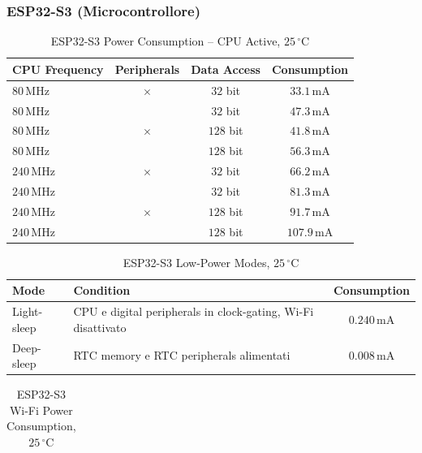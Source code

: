 \begin{samepage}
\subsubsection{ESP32-S3 (Microcontrollore)}
\begin{table}[H]
	\centering
	\caption{ESP32-S3 Power Consumption -- CPU Active, \(25\,^\circ\mathrm{C}\)}
	\label{tab:esp32s3_cpu_power}
	\begin{tabularx}{\textwidth}{lccc}
		\hline
		\textbf{CPU Frequency} & \textbf{Peripherals} & \textbf{Data Access} & \textbf{Consumption} \\
		\hline
		$80\,\text{MHz}$  & $\times$     & $32$ bit  & $33.1\,\text{mA}$ \\
		$80\,\text{MHz}$  & \checkmark   & $32$ bit  & $47.3\,\text{mA}$ \\
		$80\,\text{MHz}$  & $\times$     & $128$ bit & $41.8\,\text{mA}$ \\
		$80\,\text{MHz}$  & \checkmark   & $128$ bit & $56.3\,\text{mA}$ \\
		$240\,\text{MHz}$ & $\times$     & $32$ bit  & $66.2\,\text{mA}$ \\
		$240\,\text{MHz}$ & \checkmark   & $32$ bit  & $81.3\,\text{mA}$ \\
		$240\,\text{MHz}$ & $\times$     & $128$ bit & $91.7\,\text{mA}$ \\
		$240\,\text{MHz}$ & \checkmark   & $128$ bit & $107.9\,\text{mA}$ \\
		\hline
	\end{tabularx}
\end{table}
\begin{table}[H]
	\centering
	\caption{ESP32-S3 Low-Power Modes, \(25\,^\circ\mathrm{C}\)}
	\label{tab:esp32s3_low_power}
	\begin{tabularx}{\textwidth}{lXc}
		\hline
		\textbf{Mode} & \textbf{Condition} & \textbf{Consumption} \\
		\hline
		Light-sleep & CPU e digital peripherals in clock-gating, Wi-Fi disattivato & $0.240\,\text{mA}$ \\
		Deep-sleep & RTC memory e RTC peripherals alimentati & $0.008\,\text{mA}$ \\
		\hline
	\end{tabularx}
\end{table}
\begin{table}[H]
	\centering
	\caption{ESP32-S3 Wi-Fi Power Consumption, \(25\,^\circ\mathrm{C}\)}
	\label{tab:esp32s3_wifi_power}
	\begin{tabularx}{\textwidth}{lXc}

\end{tabularx}
\end{table}
\end{samepage}

